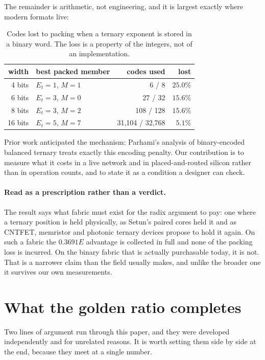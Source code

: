 \documentclass[11pt]{article}
\theoremstyle{definition}
\begin{document}
The remainder is arithmetic, not engineering, and it is largest exactly where
modern formats live:

\begin{table}[t]\centering
\caption{Codes lost to packing when a ternary exponent is stored in a binary
word. The loss is a property of the integers, not of an implementation.}
\label{tab:packloss}
\begin{tabular}{rlrr}
\toprule
width & best packed member & codes used & lost \\
\midrule
4 bits & $E_t{=}1$, $M{=}1$ & 6 / 8 & $25.0\%$ \\
6 bits & $E_t{=}3$, $M{=}0$ & 27 / 32 & $15.6\%$ \\
8 bits & $E_t{=}3$, $M{=}2$ & 108 / 128 & $15.6\%$ \\
16 bits & $E_t{=}5$, $M{=}7$ & 31{,}104 / 32{,}768 & $5.1\%$ \\
\bottomrule
\end{tabular}
\end{table}

Prior work anticipated the mechanism: Parhami's analysis of binary-encoded
balanced ternary treats exactly this encoding penalty. Our contribution is to
measure what it costs in a live network and in placed-and-routed silicon rather
than in operation counts, and to state it as a condition a designer can check.

\paragraph{Read as a prescription rather than a verdict.} The result says what
fabric must exist for the radix argument to pay: one where a ternary position is
held physically, as Setun's paired cores held it and as CNTFET, memristor and
photonic ternary devices propose to hold it again. On such a fabric the
$0.3691E$ advantage is collected in full and none of the packing loss is
incurred. On the binary fabric that is actually purchasable today, it is not.
That is a narrower claim than the field usually makes, and unlike the broader one
it survives our own measurements.



\section{What the golden ratio completes}
\label{sec:completes}

Two lines of argument run through this paper, and they were developed
independently and for unrelated reasons. It is worth setting them side by side at
the end, because they meet at a single number.
\end{document}
